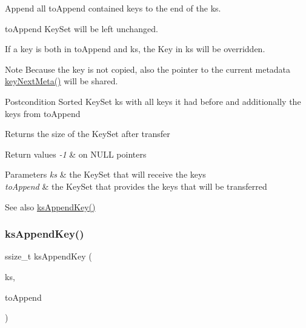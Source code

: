 Append all {\ttfamily to\+Append} contained keys to the end of the {\ttfamily ks}. 

{\ttfamily to\+Append} Key\+Set will be left unchanged.

If a key is both in to\+Append and ks, the Key in ks will be overridden.

\begin{DoxyNote}{Note}
Because the key is not copied, also the pointer to the current metadata \hyperlink{group__keymeta_ga4c88342f580a4291455a801af71ce048}{key\+Next\+Meta()} will be shared.
\end{DoxyNote}
\begin{DoxyPostcond}{Postcondition}
Sorted Key\+Set ks with all keys it had before and additionally the keys from to\+Append 
\end{DoxyPostcond}
\begin{DoxyReturn}{Returns}
the size of the Key\+Set after transfer 
\end{DoxyReturn}

\begin{DoxyRetVals}{Return values}
{\em -\/1} & on N\+U\+LL pointers \\
\hline
\end{DoxyRetVals}

\begin{DoxyParams}{Parameters}
{\em ks} & the Key\+Set that will receive the keys \\
\hline
{\em to\+Append} & the Key\+Set that provides the keys that will be transferred \\
\hline
\end{DoxyParams}
\begin{DoxySeeAlso}{See also}
\hyperlink{group__keyset_gaa5a1d467a4d71041edce68ea7748ce45}{ks\+Append\+Key()} 
\end{DoxySeeAlso}
\mbox{\label{group__keyset_gaa5a1d467a4d71041edce68ea7748ce45}} 
\subsubsection{\texorpdfstring{ks\+Append\+Key()}{ksAppendKey()}}
{\footnotesize\ttfamily ssize\+\_\+t ks\+Append\+Key (\begin{DoxyParamCaption}\item[{Key\+Set $\ast$}]{ks,  }\item[{Key $\ast$}]{to\+Append }\end{DoxyParamCaption})}



